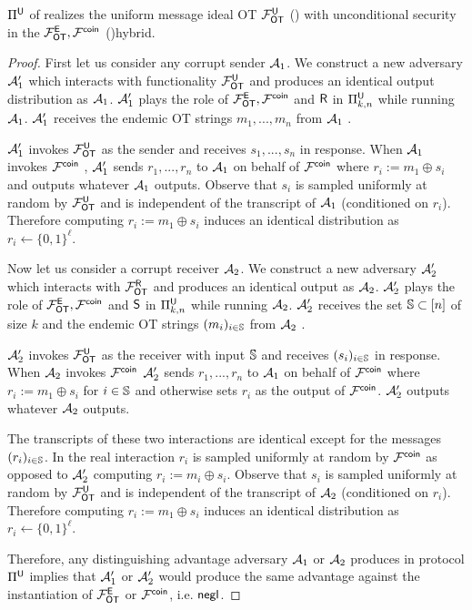 \begin{lemma}\label{lem:EtoU}
	$\Pi^{\mathsf{U}}$ of  realizes the uniform message ideal OT $\mathcal{F}_{\mathsf{OT}}^{\mathsf{U}}$ () with unconditional security in the $\mathcal{F}_{\mathsf{OT}}^\mathsf{E},\mathcal{F}^{\mathsf{coin}}$ \iffullversion()\fi hybrid.
\end{lemma}
\iffullversion
\begin{proof}
	First let us consider any corrupt sender $\mathcal{A}_1$. We construct a new adversary $\mathcal{A}_1'$ which interacts with functionality $\mathcal{F}_{\mathsf{OT}}^{\mathsf{U}}$ and produces an identical output distribution as $\mathcal{A}_1$.  $\mathcal{A}_1'$ plays the role of $\mathcal{F}_{\mathsf{OT}}^\mathsf{E},\mathcal{F}^{\mathsf{coin}}$ and $\mathsf{R}$ in $\Pi^{\mathsf{U}}_{k,n}$ while running $\mathcal{A}_1$. $\mathcal{A}_1'$ receives the endemic OT strings $m_1,...,m_n$ from $\mathcal{A}_1$%
.
	
	
	$\mathcal{A}_1'$ invokes $\mathcal{F}_{\mathsf{OT}}^{\mathsf{U}}$ as the sender and receives $s_1,...,s_n$ in response. When $\mathcal{A}_1$ invokes $\mathcal{F}^{\mathsf{coin}}$%
, $\mathcal{A}_1'$ sends $r_1,...,r_n$ to $\mathcal{A}_1$ on behalf of $\mathcal{F}^{\mathsf{coin}}$ where $r_i:=m_1\oplus s_i$ and outputs whatever $\mathcal{A}_1$ outputs. Observe that $s_i$ is sampled uniformly at random by $\mathcal{F}_{\mathsf{OT}}^{\mathsf{U}}$ and is independent of the transcript of $\mathcal{A}_1$ (conditioned on $r_i$). Therefore computing $r_i:=m_1\oplus s_i$ induces an identical distribution as $r_i\gets\{0,1\}^\ell$.
	
	Now let us consider a corrupt receiver $\mathcal{A}_2$. We construct a new adversary $\mathcal{A}_2'$ which interacts with $\mathcal{F}_{\mathsf{OT}}^{\mathsf{R}}$ and produces an identical output as $\mathcal{A}_2$. $\mathcal{A}_2'$ plays the role of $\mathcal{F}_{\mathsf{OT}}^\mathsf{E},\mathcal{F}^{\mathsf{coin}}$ and $\mathsf{S}$ in $\Pi^{\mathsf{U}}_{k,n}$ while running $\mathcal{A}_2$. $\mathcal{A}_2'$ receives the set $\mathsf{\mathbb S}\subset[n]$ of size $k$ and the endemic OT strings $(m_i)_{i\in \mathsf{\mathbb S}}$ from $\mathcal{A}_2$%
. 
	
	
	$\mathcal{A}_2'$ invokes  $\mathcal{F}_{\mathsf{OT}}^{\mathsf{U}}$ as the receiver with input $\mathsf{\mathbb S}$ and receives $(s_i)_{i\in\mathsf{\mathbb S}}$ in response. When $\mathcal{A}_2$ invokes $\mathcal{F}^{\mathsf{coin}}$%
	$\mathcal{A}_2'$ sends $r_1,...,r_n$ to $\mathcal{A}_1$ on behalf of $\mathcal{F}^{\mathsf{coin}}$ where $r_i:=m_1\oplus s_i$ for $i\in \mathsf{\mathbb S}$ and otherwise sets $r_i$ as the output of $\mathcal{F}^\mathsf{coin}$. $\mathcal{A}_2'$ outputs whatever $\mathcal{A}_2$ outputs.
	
	The transcripts of these two interactions are identical except for the messages $(r_i)_{i\in \mathsf{\mathbb S}}$. In the real interaction $r_i$ is sampled uniformly at random by $\mathcal{F}^{\mathsf{coin}}$ as opposed to $\mathcal{A}_2'$ computing $r_i:=m_i\oplus s_i$. Observe that $s_i$ is sampled uniformly at random by $\mathcal{F}_{\mathsf{OT}}^{\mathsf{U}}$ and is independent of the transcript of $\mathcal{A}_2$ (conditioned on $r_i$). Therefore computing $r_i:=m_1\oplus s_i$ induces an identical distribution as $r_i\gets\{0,1\}^\ell$.

	Therefore, any distinguishing advantage adversary $\mathcal{A}_1$ or $\mathcal{A}_2$ produces in protocol $\Pi^{\mathsf{U}}$ implies that $\mathcal{A}_1'$ or $\mathcal{A}_2'$ would produce the same advantage against the instantiation of $\mathcal{F}_{\mathsf{OT}}^\mathsf{E}$ or $\mathcal{F}^\mathsf{coin}$, i.e. $\mathsf{negl}$.
	
\end{proof}

